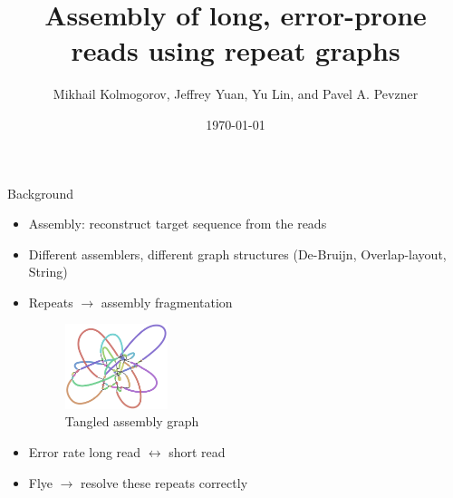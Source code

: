 \documentclass{beamer}
\title{Assembly of long, error-prone reads using repeat graphs}
\date{\today}
\author{Mikhail Kolmogorov, Jeffrey Yuan, Yu Lin, and Pavel A. Pevzner}
\institute{Johannes Hausmann, Luis Kress}
\begin{document}
  \maketitle
  
  
  \begin{frame}{Background}
    \begin{itemize}[<+- | alert@+>]
      \item Assembly: reconstruct target sequence from the reads

      \item Different assemblers, different graph structures (De-Bruijn, Overlap-layout, String)

      \item Repeats $\rightarrow$ assembly fragmentation
      \begin{figure}
        \includegraphics[width=3cm]{images/tangled.png}
        \caption{Tangled assembly graph}
        \label{fig:tangled}
      \end{figure}

      \item Error rate long read $\leftrightarrow$ short read

      \item Flye $\rightarrow$ resolve these repeats correctly
    \end{itemize}
  \end{frame}

\end{document}
